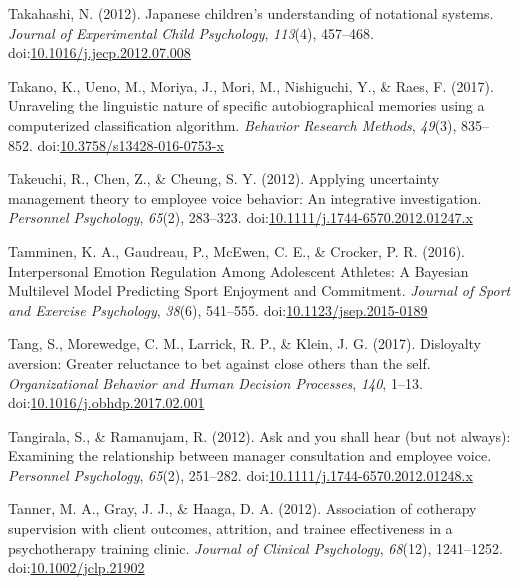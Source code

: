 \documentclass[english,man]{apa6}
\begin{document}
\hypertarget{ref-Takahashi2012}{}
Takahashi, N. (2012). Japanese children's understanding of notational
systems. \emph{Journal of Experimental Child Psychology}, \emph{113}(4),
457--468.
doi:\href{https://doi.org/10.1016/j.jecp.2012.07.008}{10.1016/j.jecp.2012.07.008}

\hypertarget{ref-Takano2017}{}
Takano, K., Ueno, M., Moriya, J., Mori, M., Nishiguchi, Y., \& Raes, F.
(2017). Unraveling the linguistic nature of specific autobiographical
memories using a computerized classification algorithm. \emph{Behavior
Research Methods}, \emph{49}(3), 835--852.
doi:\href{https://doi.org/10.3758/s13428-016-0753-x}{10.3758/s13428-016-0753-x}

\hypertarget{ref-Takeuchi2012}{}
Takeuchi, R., Chen, Z., \& Cheung, S. Y. (2012). Applying uncertainty
management theory to employee voice behavior: An integrative
investigation. \emph{Personnel Psychology}, \emph{65}(2), 283--323.
doi:\href{https://doi.org/10.1111/j.1744-6570.2012.01247.x}{10.1111/j.1744-6570.2012.01247.x}

\hypertarget{ref-Tamminen2016}{}
Tamminen, K. A., Gaudreau, P., McEwen, C. E., \& Crocker, P. R. (2016).
Interpersonal Emotion Regulation Among Adolescent Athletes: A Bayesian
Multilevel Model Predicting Sport Enjoyment and Commitment.
\emph{Journal of Sport and Exercise Psychology}, \emph{38}(6), 541--555.
doi:\href{https://doi.org/10.1123/jsep.2015-0189}{10.1123/jsep.2015-0189}

\hypertarget{ref-Tang2017}{}
Tang, S., Morewedge, C. M., Larrick, R. P., \& Klein, J. G. (2017).
Disloyalty aversion: Greater reluctance to bet against close others than
the self. \emph{Organizational Behavior and Human Decision Processes},
\emph{140}, 1--13.
doi:\href{https://doi.org/10.1016/j.obhdp.2017.02.001}{10.1016/j.obhdp.2017.02.001}

\hypertarget{ref-Tangirala2012}{}
Tangirala, S., \& Ramanujam, R. (2012). Ask and you shall hear (but not
always): Examining the relationship between manager consultation and
employee voice. \emph{Personnel Psychology}, \emph{65}(2), 251--282.
doi:\href{https://doi.org/10.1111/j.1744-6570.2012.01248.x}{10.1111/j.1744-6570.2012.01248.x}

\hypertarget{ref-Tanner2012}{}
Tanner, M. A., Gray, J. J., \& Haaga, D. A. (2012). Association of
cotherapy supervision with client outcomes, attrition, and trainee
effectiveness in a psychotherapy training clinic. \emph{Journal of
Clinical Psychology}, \emph{68}(12), 1241--1252.
doi:\href{https://doi.org/10.1002/jclp.21902}{10.1002/jclp.21902}
\end{document}
